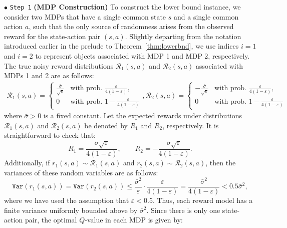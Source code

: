 \documentclass{article}
\newcommand{\mc}{\mathcal}
\begin{document}
\(\bullet\) \textcolor{winered}{\texttt{Step 1}} \textbf{(MDP Construction)} To construct the lower bound instance, we consider two MDPs that have a single common state \(s\) and a single common action \(a\), such that the only source of randomness arises from the observed reward for the state-action pair $(s,a)$. Slightly departing from the notation introduced earlier in the prelude to Theorem~\ref{thm:lowerbnd}, we use indices $i=1$ and $i=2$ to represent objects associated with MDP 1 and MDP 2, respectively. The true noisy reward distributions $\mc{R}_1(s,a)$ and $\mc{R}_2(s,a)$ associated with MDPs 1 and 2 are as follows: 
\begin{equation}\label{eqn:lower_bound_reward_distribution}
\begin{aligned}
\mc{R}_1(s,a)=\begin{cases}
      \frac{\bar{\sigma}}{\sqrt{\varepsilon}} & \text{with prob. $\frac{\varepsilon}{4 (1-\varepsilon)}$},\\
      0 & \text{with prob. $1 - \frac{\varepsilon}{4 (1-\varepsilon)}$}
    \end{cases}
    , \mc{R}_2(s,a)=\begin{cases}
      - \frac{\bar{\sigma}}{\sqrt{\varepsilon}} & \text{with prob. $\frac{\varepsilon}{4 (1-\varepsilon)}$},\\
      0 & \text{with prob. $1 - \frac{\varepsilon}{4 (1-\varepsilon)}$}
    \end{cases} 
\end{aligned}
\end{equation}
where $\bar{\sigma} > 0$ is a fixed constant. Let the expected rewards under distributions $\mc{R}_1(s,a)$ and $\mc{R}_2(s,a)$ be denoted by \(R_1\) and \(R_2\), respectively. It is straightforward to check that:
\begin{equation}\label{eqn:lower_bound_reward_distribution_mean}
R_1 = \frac{\bar{\sigma} \sqrt{\varepsilon}}{4(1 - \varepsilon)}, \qquad R_2 = -\frac{\bar{\sigma} \sqrt{\varepsilon}}{4(1 - \varepsilon)}.
\end{equation}
Additionally, if \( r_1(s,a) \sim \mc{R}_1(s,a) \) and \( r_2(s,a) \sim \mc{R}_2(s,a) \), then the variances of these random variables are as follows: 
\begin{equation}
\mathrm{\texttt{Var}}(r_1(s,a)) = \mathrm{\texttt{Var}}(r_2(s,a)) \leq \frac{\bar{\sigma}^2}{\varepsilon} \cdot \frac{\varepsilon}{4(1 - \varepsilon)} = \frac{\bar{\sigma}^2}{4(1 - \varepsilon)} < 0.5 \bar{\sigma}^2,
\end{equation}
where we have used the assumption that \( \varepsilon < 0.5 \). Thus, each reward model has a finite variance uniformly bounded above by \( \bar{\sigma}^2 \). Since there is only one state-action pair, the optimal \(Q\)-value in each MDP is given by:
\end{document}
